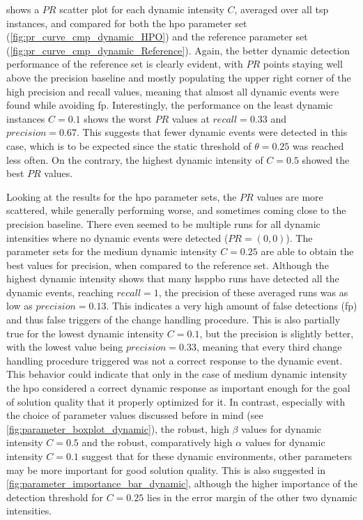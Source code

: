  shows a $PR$ scatter plot for each dynamic intensity $C$, averaged over all \gls{tsp} instances, and compared for both the \gls{hpo} parameter set (\ref{fig:pr_curve_cmp_dynamic_HPO}) and the reference parameter set (\ref{fig:pr_curve_cmp_dynamic_Reference}). Again, the better dynamic detection performance of the reference set is clearly evident, with $PR$ points staying well above the precision baseline and mostly populating the upper right corner of the high precision and recall values, meaning that almost all dynamic events were found while avoiding \glsdesc{fp}. Interestingly, the performance on the least dynamic instances $C=0.1$ shows the worst $PR$ values at $recall = 0.33$ and $precision = 0.67$. This suggests that fewer dynamic events were detected in this case, which is to be expected since the static threshold of $\theta =0.25$ was reached less often. On the contrary, the highest dynamic intensity of $C=0.5$ showed the best $PR$ values.

Looking at the results for the \gls{hpo} parameter sets, the $PR$ values are more scattered, while generally performing worse, and sometimes coming close to the precision baseline. There even seemed to be multiple runs for all dynamic intensities where no dynamic events were detected ($PR = (0,0)$). 
The parameter sets for the medium dynamic intensity $C=0.25$ are able to obtain the best values for precision, when compared to the reference set. Although the highest dynamic intensity shows that many \gls{hsppbo} runs have detected all the dynamic events, reaching $recall =1$, the precision of these averaged runs was as low as $precision=0.13$. This indicates a very high amount of false detections (\gls{fp}) and thus false triggers of the change handling procedure. This is also partially true for the lowest dynamic intensity $C=0.1$, but the precision is slightly better, with the lowest value being $precision=0.33$, meaning that every third change handling procedure triggered was not a correct response to the dynamic event. This behavior could indicate that only in the case of medium dynamic intensity the \gls{hpo} considered a correct dynamic response as important enough for the goal of solution quality that it properly optimized for it. In contrast, especially with the choice of parameter values discussed before in mind (see \cref{fig:parameter_boxplot_dynamic}), the robust, high $\beta$ values for dynamic intensity $C=0.5$ and the robust, comparatively high $\alpha$ values for dynamic intensity $C=0.1$ suggest that for these dynamic environments, other parameters may be more important for good solution quality. This is also suggested in \cref{fig:parameter_importance_bar_dynamic}, although the higher importance of the detection threshold for $C=0.25$ lies in the error margin of the other two dynamic intensities.

